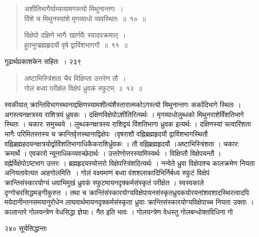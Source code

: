 \documentclass[11pt, openany]{book}
\begin{document}

\begin{quote}
{\ssi अशीतिभागैर्याम्यायामगस्त्यो मिथुनान्तगः~।\\
 विंशे च मिथुनस्यांशे मृगव्याधो व्यवस्थितः~॥~१०~॥

विक्षेपो दक्षिणे भागैः खार्णवैः स्वादपक्रमात्~।\\
हुतभुग्ब्रह्महृदयौ वृषे द्वाविंशभागगौ~॥~११~॥}
\end{quote}
\newpage


\hspace{3cm} गूढार्थप्रकाशकेन सहितः~। \hfill २३९

\begin{quote}
{\ssi अष्टाभिस्त्रिंशता चैव विक्षिप्ता उत्तरेण तौ~।\\
 गोलं बध्वा परीक्षेत विक्षेपं ध्रुवकं स्फुटम्~॥~१२~॥ }
\end{quote}

 स्वकीयात् क्रान्तिविभागस्थानाद्दक्षिणस्यामशीत्यंशैस्तारात्मकोऽगस्त्यो मिथुनान्तगः कर्कादिभागे स्थितः । अगस्त्यनक्षत्रस्य राशित्रयं ध्रुवकः । दक्षिणविक्षेपोऽशीतिरित्यर्थः । मृगव्याधोलुब्धको मिथुनराशेर्विंशतिभागे स्थितः । चकारः समुच्चये । लुब्धकनक्षत्रस्य राशिद्वयं विंशतिभागा ध्रुवक इत्यर्थः । दक्षिणस्यां चत्वारिंशता भागैः परिमितस्तस्य च क्रान्तिर्वृत्तस्थानाद्विक्षेपः ।वृषराशौ वह्निब्रह्महृदयौ द्वाविंशभागस्थितौ वह्निब्रह्महदयनक्षत्रयोर्द्वाविंशतिभागाधिकैकराशिर्ध्रुवकः । तौ वह्निब्रह्महृदयौ ।अष्टाभिस्त्रिंशता । चकारः क्रमार्थे । एवकारो न्यूनाधिकव्यवच्छेदार्थः । उत्तरेणोत्तरस्यामिस्यर्थः । विक्षिप्तौ विक्षेपयन्तौ । वह्नेर्विक्षेपोऽष्टभाग उत्तरः । ब्रह्महृदयस्योत्तरो विक्षेपस्त्रिंशदित्यर्थः । नन्वेते ध्रुवा विक्षेपाश्च कालक्रमेण नियता अनियतावेत्यत  आह\textendash गोलमिति~। गोलं वक्ष्यमाणं बध्वा वंशशलाकादिभिर्निर्बध्य स्फुटं विक्षेपं क्रान्तिसंस्कारयोग्यं धवाभिमुखं ध्रुवकं स्फुटमायनदृक्कर्मसंस्कृतं परीक्षेत । स्वस्वकाले दृग्गोचरसिद्धमङ्गीकुरुत । तथा च क्रान्तिंसंस्कारयोग्यविक्षेपायनसंस्कृतध्रुवकयोरयनांशवशादस्थिरत्वादपि मयेदानीन्तनसमयानुरोधेन लाघवार्थमायनदृक्कर्मसंस्कृता ध्रुवाः क्रान्तिसंस्कारयोग्यविक्षेपाच्च नियता उक्ताः । कालान्तरे गोलयन्त्रेण वेधसिद्धा ज्ञेयाः। नैत इति भावः । गोलयन्त्रेण वेधस्तु गोलबन्धोक्तविधिना गो\textendash



\newpage

\noindent २४० \hspace{4cm} सूर्यसिद्धान्तः
\vspace{1cm}
\end{document}
